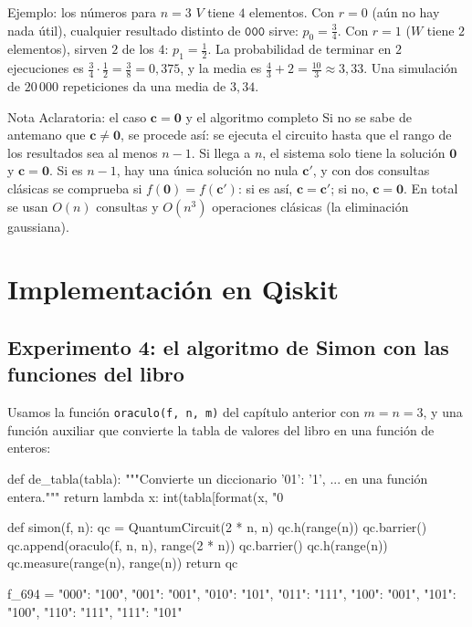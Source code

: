 \documentclass[11pt, a4paper, twoside, openright]{report}
\newcommand{\bc}{\mathbf{c}}
\newcommand{\bcero}{\mathbf{0}}
\begin{document}
\begin{ejemplo}{Ejemplo: los números para $n = 3$}
$V$ tiene $4$ elementos. Con $r = 0$ (aún no hay nada útil), cualquier resultado distinto de $\texttt{000}$ sirve: $p_0 = \frac34$. Con $r = 1$ ($W$ tiene $2$ elementos), sirven $2$ de los $4$: $p_1 = \frac12$. La probabilidad de terminar en $2$ ejecuciones es $\frac34\cdot\frac12 = \frac38 = 0{,}375$, y la media es $\frac43 + 2 = \frac{10}{3}\approx3{,}33$. Una simulación de $20\,000$ repeticiones da una media de $3{,}34$.
\end{ejemplo}

\begin{aclaracion}{Nota Aclaratoria: el caso $\bc = \bcero$ y el algoritmo completo}
Si no se sabe de antemano que $\bc\neq\bcero$, se procede así: se ejecuta el circuito hasta que el rango de los resultados sea al menos $n-1$. Si llega a $n$, el sistema solo tiene la solución $\bcero$ y $\bc = \bcero$. Si es $n-1$, hay una única solución no nula $\bc'$, y con dos consultas clásicas se comprueba si $f(\bcero) = f(\bc')$: si es así, $\bc = \bc'$; si no, $\bc = \bcero$. En total se usan $O(n)$ consultas y $O(n^3)$ operaciones clásicas (la eliminación gaussiana).
\end{aclaracion}

\cleardoublepage
\section{Implementación en Qiskit}

\subsection{Experimento 4: el algoritmo de Simon con las funciones del libro}

\noindent Usamos la función \texttt{oraculo(f, n, m)} del capítulo anterior con $m = n = 3$, y una función auxiliar que convierte la tabla de valores del libro en una función de enteros:
\begin{codigo}
def de_tabla(tabla):
    """Convierte un diccionario {'01': '1', ...} en una función entera."""
    return lambda x: int(tabla[format(x, "0%

def simon(f, n):
    qc = QuantumCircuit(2 * n, n)
    qc.h(range(n))
    qc.barrier()
    qc.append(oraculo(f, n, n), range(2 * n))
    qc.barrier()
    qc.h(range(n))
    qc.measure(range(n), range(n))
    return qc

f_694 = {"000": "100", "001": "001", "010": "101", "011": "111",
         "100": "001", "101": "100", "110": "111", "111": "101"}
\end{codigo}
\end{document}
